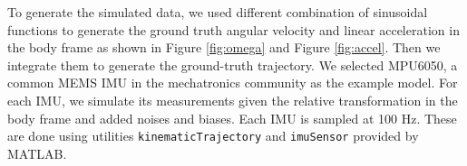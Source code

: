 \documentclass[conference]{IEEEtran}
\begin{document}
To generate the simulated data, we used different combination of sinusoidal functions to generate the ground truth angular velocity and linear acceleration in the body frame as shown in Figure \ref{fig:omega} and Figure \ref{fig:accel}. Then we integrate them to generate the ground-truth trajectory. We selected MPU6050, a common MEMS IMU in the mechatronics community as the example model. For each IMU, we simulate its measurements given the relative transformation in the body frame and added noises and biases. Each IMU is sampled at 100 Hz. These are done using utilities \texttt{kinematicTrajectory} and \texttt{imuSensor} provided by MATLAB.


\end{document}

